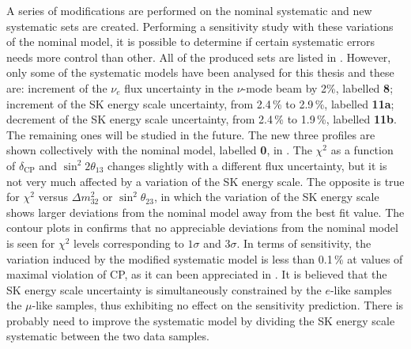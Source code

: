 A series of modifications are performed on the nominal systematic and new systematic sets are created.
Performing a sensitivity study with these variations of the nominal model, it is possible to determine %
if certain systematic errors needs more control than other.
All of the produced sets are listed in .
However, only some of the systematic models have been analysed for this thesis and these are:
increment of the $\nu_e$ flux uncertainty in the $\nu$-mode beam by 2\%, labelled \textbf{8}; %
increment of the SK energy scale uncertainty, from 2.4\,\% to 2.9\,\%, labelled \textbf{11a}; %
decrement of the SK energy scale uncertainty, from 2.4\,\% to 1.9\,\%, labelled \textbf{11b}.
The remaining ones will be studied in the future.
The new three profiles are shown collectively with the nominal model, labelled \textbf{0}, in .
The $\chi^2$ as a function of $\delta_\text{CP}$ and $\sin^2 2\theta_{13}$ changes slightly with a different flux uncertainty, %
but it is not very much affected by a variation of the SK energy scale.
The opposite is true for $\chi^2$ versus $\Delta m_{32}^2$ or $\sin^2\theta_{23}$, in which %
the variation of the SK energy scale shows larger deviations from the nominal model away from the best fit value.
The contour plots in  confirms that no appreciable deviations from the nominal model %
is seen for $\chi^2$ levels corresponding to $1\sigma$ and $3\sigma$.
In terms of sensitivity, the variation induced by the modified systematic model is %
less than 0.1\,\% at values of maximal violation of CP, as it can been appreciated in .
It is believed that the SK energy scale uncertainty is simultaneously constrained by the $e$-like samples %
the $\mu$-like samples, thus exhibiting no effect on the sensitivity prediction.
There is probably need to improve the systematic model by dividing the SK energy scale systematic %
between the two data samples.

